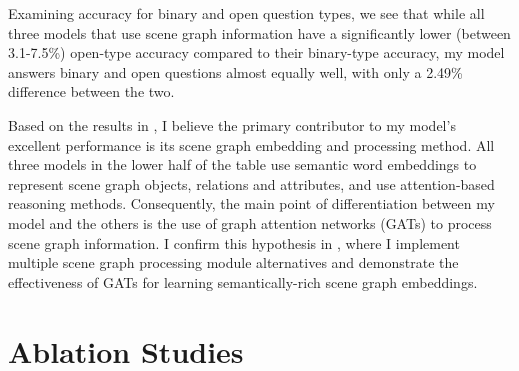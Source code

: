 Examining accuracy for binary and open question types, we see that while all three models that use scene graph information have a significantly lower (between 3.1-7.5\%) open-type accuracy compared to their binary-type accuracy, my model answers binary and open questions almost equally well, with only a 2.49\% difference between the two.


Based on the results in \tableautorefname{ \ref{table:performance_comparison}}, I believe the primary contributor to my model's excellent performance is its scene graph embedding and processing method. All three models in the lower half of the table use semantic word embeddings to represent scene graph objects, relations and attributes, and use attention-based reasoning methods. Consequently, the main point of differentiation between my model and the others is the use of graph attention networks (GATs) to process scene graph information. I confirm this hypothesis in \subsectionautorefname{ \ref{subsec:scene_graph_module_ablations}}, where I implement multiple scene graph processing module alternatives and demonstrate the effectiveness of GATs for learning semantically-rich scene graph embeddings.

\section{Ablation Studies}
\label{sec:ablation_studies}

